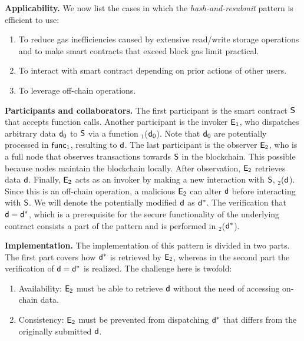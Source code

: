 \noindent
\textbf{Applicability.}
We now list the cases in which the \emph{hash-and-resubmit} pattern is
efficient to use:
\begin{enumerate}
    \item To reduce gas inefficiencies caused by extensive read/write storage
        operations and to make smart contracts that exceed block gas limit
        practical.
    \item To interact with smart contract depending on prior actions of other
        users.
    \item To leverage off-chain operations.
\end{enumerate}

\noindent \textbf{Participants and collaborators.} The first participant is the
smart contract $\mathsf{S}$ that accepts function calls. Another participant is
the invoker $\mathsf{E_{1}}$, who dispatches arbitrary data $\mathsf{d}_0$ to $\mathsf{S}$
via a function \texttt{\proc$_1$}($\mathsf{d}_0$). Note that $\mathsf{d}_0$ are
potentially processed in $\textsf{func}_1$, resulting to $\mathsf{d}$. The last participant
is the observer $\mathsf{E_{2}}$, who is a full node that observes transactions
towards $\mathsf{S}$ in the blockchain. This possible because nodes maintain
the blockchain locally. After observation, $\mathsf{E_{2}}$ retrieves data $\mathsf{d}$.
Finally, $\mathsf{E_{2}}$ acts as an invoker by making a new interaction with
$\mathsf{S}$, \texttt{\proc$_2$}($\mathsf{d}$). Since this is an off-chain operation,
a malicious $\mathsf{E_{2}}$ can alter $\mathsf{d}$ before interacting with $\mathsf{S}$.
We will denote the potentially modified $\mathsf{d}$ as $\mathsf{d^*}$. The verification
that $\mathsf{d} = \mathsf{d^*}$, which is a prerequisite for the secure functionality of
the underlying contract consists a part of the pattern and is performed in
\texttt{\proc$_2$}($\mathsf{d^*}$).

\noindent \textbf{Implementation.} The implementation of this pattern is
divided in two parts. The first part covers how $\mathsf{d^*}$ is retrieved by
$\mathsf{E_{2}}$, whereas in the second part the verification of $\mathsf{d}=\mathsf{d^*}$ is
realized. The challenge here is twofold:

\begin{enumerate}

    \item Availability: $\mathsf{E_{2}}$ must be able to retrieve $\mathsf{d}$ without
        the need of accessing on-chain data.

    \item Consistency: $\mathsf{E_{2}}$ must be prevented from dispatching $\mathsf{d^*}$
        that differs from the originally submitted $\mathsf{d}$.

\end{enumerate}

